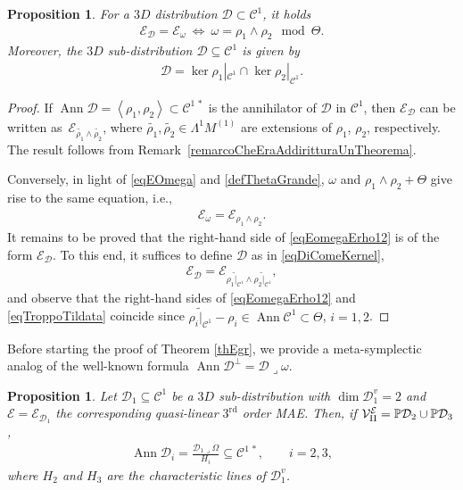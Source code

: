 \documentclass[pdftex]{sigma}
\newcommand{\C}{\mathcal{C}}
\newcommand{\D}{\mathcal{D}}
\newcommand{\MMM}{\mathcal{V}_{\textrm{\normalfont II}}}
\newcommand{\E}{\mathcal{E}}
\newcommand{\Ann}{\operatorname{Ann}}
\newcommand{\Span}[1]{\left\langle #1 \right\rangle}
\renewcommand{\P}{\mathbb{P}}
\newcommand{\Rd}{^\textrm{rd}}
\newcommand{\elle}{H}
\numberwithin{equation}{section}
\newtheorem{Proposition}[Theorem]{Proposition}
 { \theoremstyle{definition}
\newtheorem{Definition}[Theorem]{Definition}
\newtheorem{Example}[Theorem]{Example}
\newtheorem{Remark}[Theorem]{Remark} }
\begin{document}
\begin{Proposition}\label{proposizioneVeramenteSudata}
 For a $3D$ distribution $\D\subset\C^1$, it holds
 \begin{gather*}
\E_\D=\E_\omega \ \Leftrightarrow \ \omega=\rho_1\wedge\rho_2 \mod \Theta.
\end{gather*}
Moreover, the $3D$ sub-distribution $\D\subseteq\C^1$ is given by
\begin{gather}\label{eqDiComeKernel}
\D=\ker \rho_1|_{\C^1}\cap \ker \rho_2|_{\C^1}.
\end{gather}
\end{Proposition}
\begin{proof}
If $\Ann\D=\Span{\rho_1,\rho_2}\subset\C^{1\,\ast}$ is the annihilator of $\D$ in $\C^1$, then
$\E_\D$ can be written as~$\E_{\widetilde{\rho_1}\wedge\widetilde{\rho_2}}$, where $\widetilde{\rho_1},\widetilde{\rho_2}\in\Lambda^1M^{(1)}$ are extensions of $\rho_1$, $\rho_2$, respectively. The
 result follows from Remark~\ref{remarcoCheEraAddiritturaUnTheorema}.

Conversely, in light of \eqref{eqEOmega} and \eqref{defThetaGrande}, $\omega$ and $\rho_1\wedge\rho_2+\Theta$ give rise to the same equation, i.e.,
 \begin{gather}\label{eqEomegaErho12}
\E_\omega=\E_{\rho_1\wedge\rho_2}.
\end{gather}
It remains to be proved that the right-hand side of \eqref{eqEomegaErho12} is of the form $\E_\D$. To this end, it suf\/f\/ices to def\/ine $\D$ as in \eqref{eqDiComeKernel},
\begin{gather}\label{eqTroppoTildata}
\E_\D= \E_{\widetilde{\rho_1|_{\C^1}}\wedge\widetilde{\rho_2|_{\C^1}}},
\end{gather}
 and observe that the right-hand sides of \eqref{eqEomegaErho12} and
\eqref{eqTroppoTildata} coincide since
$
\widetilde{\rho_i|_{\C^1}}-\rho_i\in\Ann\C^1\subset\Theta$, $i=1,2$.
\end{proof}

Before starting the proof of Theorem \ref{thEgr}, we provide a meta-symplectic analog of the well-known formula $\Ann\D^\perp=\D\lrcorner\omega$.

\begin{Proposition}\label{propAnnullatoreEDirezioni}
 Let $\D_1\subseteq\C^1$ be a $3D$ sub-distribution with $\dim\D_1^v=2$ and $\E=\E_{\D_1}$ the corresponding quasi-linear $3\Rd$ order MAE. Then, if $\MMM^\E=\P\D_2\cup\P\D_3$,
 \begin{gather}
\Ann\D_i= {\frac{\D_1\lrcorner \Omega}{\elle_i}}\subseteq\C^{1\,\ast}, \qquad i=2,3, \label{eqAnnullDi}
\end{gather}
where $\elle_2$ and $\elle_3$ are the characteristic lines of
 $\D_1^v$.
\end{Proposition}
\end{document}
